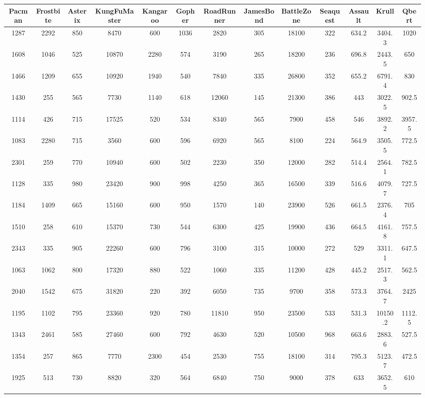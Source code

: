 \documentclass{article}
\begin{document}
\begin{table*}[!ht]\centering
\small
\setlength\tabcolsep{2.5pt}
\begin{tabular}{c|c|c|c|c|c|c|c|c|c|c|c|c}
\hline
Pacman &	Frostbite &	Asterix  &	KungFuMaster &	Kangaroo &	Gopher &	RoadRunner &	JamesBond &	BattleZone &	Seaquest &	Assault &	Krull &	Qbert			 \\
\hline
1287 &	2292 &	850 &	8470 &	600 &	1036 &	2820 &	305 &	18100 &	322 &	634.2 &	3404.3 &	1020 \\
1608 &	1046 &	525 &	10870 &	2280 &	574 &	3190 &	265 &	18200 &	236 &	696.8 &	2443.5 &	650  \\
1466 &	1209 &	655 &	10920 &	1940 &	540 &	7840 &	335 &	26800 &	352 &	655.2 &	6791.4 &	830  \\
1430 &	255 &	565 &	7730 &	1140 &	618 &	12060 &	145 &	21300 &	386 &	443 &	3022.5 &	902.5  \\
1114 &	426 &	715 &	17525 &	520 &	534 &	8340 &	565 &	7900 &	458 &	546 &	3892.2 &	3957.5  \\
1083 &	2280 &	715 &	3560 &	600 &	596 &	6920 &	565 &	8100 &	224 &	564.9 &	3505.5 &	772.5 \\
2301 &	259 &	770 &	10940 &	600 &	502 &	2230 &	350 &	12000 &	282 &	514.4 &	2564.1 &	782.5  \\
1128 &	335 &	980 &	23420 &	900 &	998 &	4250 &	365 &	16500 &	339 &	516.6 &	4079.7 &	727.5  \\
1184 &	1409 &	665 &	15160 &	600 &	950 &	1570 &	140 &	23900 &	526 &	661.5 &	2376.4 &	705 \\
1510 &	258 &	610 &	15370 &	730 &	544 &	6300 &	425 &	19900 &	436 &	664.5 &	4161.8 &	757.5  \\
2343 &	335 &	905 &	22260 &	600 &	796 &	3100 &	315 &	10000 &	272 &	529 &	3311.1 &	647.5  \\
1063 &	1062 &	800 &	17320 &	880 &	522 &	1060 &	335 &	11200 &	428 &	445.2 &	2517.3 &	562.5  \\
2040 &	1542 &	675 &	31820 &	220 &	392 &	6050 &	735 &	9700 &	358 &	573.3 &	3764.7 &	2425  \\
1195 &	1102 &	795 &	23360 &	920 &	780 &	11810 &	950 &	23500 &	533 &	531.3 &	10150.2 &	1112.5  \\
1343 &	2461 &	585	 & 27460 & 600 &	792 &	4630 &	520 &	10500 &	968 &	663.6 &	2883.6 &	527.5  \\
1354 &	257 &	865 &	7770 &	2300 &	454 &	2530 &	755 &	18100 &	314 &	795.3 &	5123.7	 & 472.5  \\
1925 &	513 &	730 &	8820 &	320 &	564 &	6840 &	750 &	9000 &	378 &	633 &	3652.5 &	610  \\

\end{tabular}
\end{table*}
\end{document}
